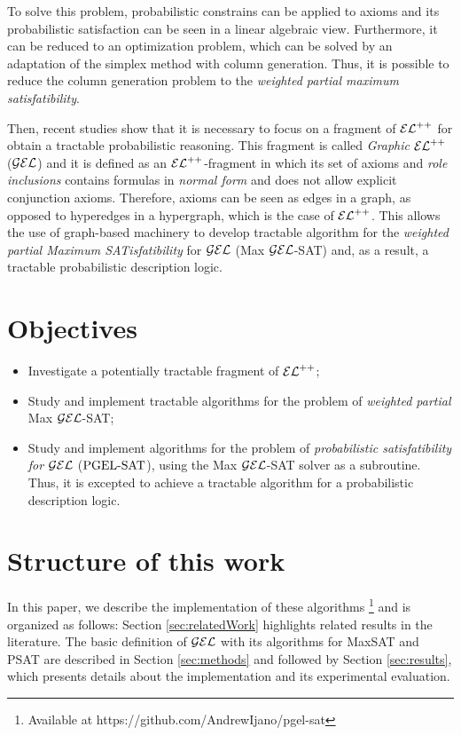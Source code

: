     
To solve this problem, probabilistic constrains can be applied to axioms and its probabilistic satisfaction can be seen in a linear algebraic view. Furthermore, it can be reduced to an optimization problem, which can be solved by an adaptation of the simplex method with column generation. \citep{Fin2019b} Thus, it is possible to reduce the column generation problem to the \emph{weighted partial maximum satisfatibility}.


Then, recent studies show that it is necessary to focus on a fragment of $\mathcal{EL}^{++}$ for obtain a tractable probabilistic reasoning. This fragment is called \emph{Graphic} $\mathcal{EL}^{++}$ ($\mathcal{GEL}$) and it is defined as an $\mathcal{EL}^{++}$-fragment in which its set of axioms and \emph{role inclusions} contains formulas in \emph{normal form} and does not allow explicit conjunction axioms. Therefore, axioms can be seen as edges in a graph, as opposed to hyperedges in a hypergraph, which is the case of $\mathcal{EL}^{++}$. This allows the use of graph-based machinery to develop tractable algorithm for the \emph{weighted partial Maximum SATisfatibility} for $\mathcal{GEL}$ (Max $\mathcal{GEL}$-SAT) and, as a result, a tractable probabilistic description logic.

\section{Objectives}
\begin{itemize}
  \item Investigate a potentially tractable fragment of $\mathcal{EL}^{++}$;
  \item Study and implement tractable algorithms for the problem of \emph{weighted partial} Max $\mathcal{GEL}$-SAT;
  \item Study and implement algorithms for the problem of \emph{probabilistic satisfatibility for $\mathcal{GEL}$} ($\text{PGEL-SAT}$), using the Max $\mathcal{GEL}$-SAT solver as a subroutine. Thus, it is excepted to achieve a tractable algorithm for a probabilistic description logic.
\end{itemize}

\section{Structure of this work}
In this paper, we describe the implementation of these algorithms \footnote{Available at https://github.com/AndrewIjano/pgel-sat} and is organized as follows: Section \ref{sec:relatedWork} highlights related results in the literature. The basic definition of $\mathcal{GEL}$ with its algorithms for MaxSAT and PSAT are described in Section \ref{sec:methods} and followed by Section \ref{sec:results}, which presents details about the implementation and its experimental evaluation.
